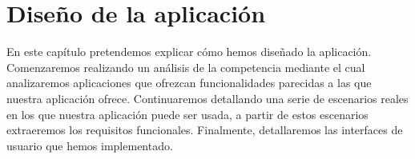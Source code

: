 
\cleardoublepage


\chapter{Diseño de la aplicación}
\label{makereference3}
En este capítulo pretendemos explicar cómo hemos diseñado la aplicación. Comenzaremos realizando un análisis de la competencia mediante el cual analizaremos aplicaciones que ofrezcan funcionalidades parecidas a las que nuestra 
aplicación ofrece. Continuaremos detallando una serie de escenarios reales en los que nuestra aplicación puede ser usada, a partir de estos escenarios extraeremos los requisitos funcionales. Finalmente, detallaremos las interfaces de usuario que hemos implementado.

